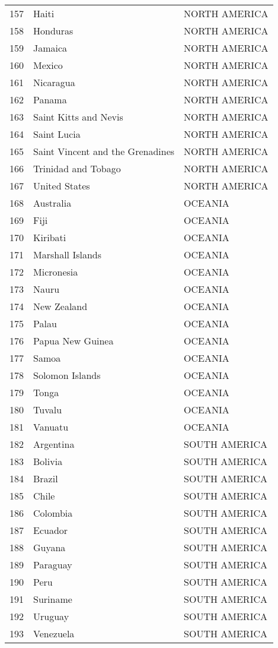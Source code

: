 \documentclass[11pt]{article}
\begin{document}
\begin{center}
\begin{tabular}{rll}
157 & Haiti & NORTH AMERICA\\
158 & Honduras & NORTH AMERICA\\
159 & Jamaica & NORTH AMERICA\\
160 & Mexico & NORTH AMERICA\\
161 & Nicaragua & NORTH AMERICA\\
162 & Panama & NORTH AMERICA\\
163 & Saint Kitts and Nevis & NORTH AMERICA\\
164 & Saint Lucia & NORTH AMERICA\\
165 & Saint Vincent and the Grenadines & NORTH AMERICA\\
166 & Trinidad and Tobago & NORTH AMERICA\\
167 & United States & NORTH AMERICA\\
168 & Australia & OCEANIA\\
169 & Fiji & OCEANIA\\
170 & Kiribati & OCEANIA\\
171 & Marshall Islands & OCEANIA\\
172 & Micronesia & OCEANIA\\
173 & Nauru & OCEANIA\\
174 & New Zealand & OCEANIA\\
175 & Palau & OCEANIA\\
176 & Papua New Guinea & OCEANIA\\
177 & Samoa & OCEANIA\\
178 & Solomon Islands & OCEANIA\\
179 & Tonga & OCEANIA\\
180 & Tuvalu & OCEANIA\\
181 & Vanuatu & OCEANIA\\
182 & Argentina & SOUTH AMERICA\\
183 & Bolivia & SOUTH AMERICA\\
184 & Brazil & SOUTH AMERICA\\
185 & Chile & SOUTH AMERICA\\
186 & Colombia & SOUTH AMERICA\\
187 & Ecuador & SOUTH AMERICA\\
188 & Guyana & SOUTH AMERICA\\
189 & Paraguay & SOUTH AMERICA\\
190 & Peru & SOUTH AMERICA\\
191 & Suriname & SOUTH AMERICA\\
192 & Uruguay & SOUTH AMERICA\\
193 & Venezuela & SOUTH AMERICA\\
\end{tabular}
\end{center}
\end{document}
